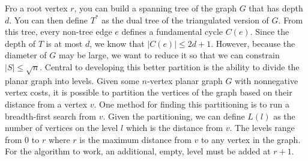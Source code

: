 \documentclass[12pt]{article}
\begin{document}
    Fro a root vertex $r$, you can build a spanning tree of the graph $G$ that has depth $d$. You can then define $T^*$ as the dual tree of the triangulated version of $G$. From this tree, every non-tree edge $e$ defines a fundamental cycle $C(e)$. Since the depth of $T$ is at most $d$, we know that $|C(e)| \leq 2d + 1$. However, because the diameter of $G$ may be large, we want to reduce it so that we can constrain $|S| \leq \sqrt{n}$. Central to developing this better partition is the ability to divide the planar graph into levels. Given some $n$-vertex planar graph $G$ with nonnegative vertex costs, it is possible to partition the vertices of the graph based on their distance from a vertex $v$. One method for finding this partitioning is to run a breadth-first search from $v$. Given the partitioning, we can define $L(l)$ as the number of vertices on the level $l$ which is the distance from $v$. The levels range from $0$ to $r$ where $r$ is the maximum distance from $v$ to any vertex in the graph. For the algorithm to work, an additional, empty, level must be added at $r+1$.
\end{document}
